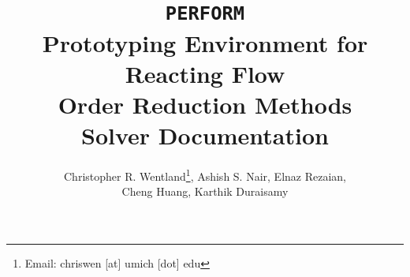 \documentclass[12pt]{article}
\title{\textbf{\texttt{PERFORM} \\ Prototyping Environment for Reacting Flow \\ Order Reduction Methods} \\ \vspace{0.5cm} Solver Documentation}
\author{Christopher R. Wentland\footnote{Email: chriswen [at] umich [dot] edu}, Ashish S. Nair, Elnaz Rezaian, \\ Cheng Huang, Karthik Duraisamy}
\begin{document}
\maketitle 

\newpage
\tableofcontents







\newpage
{}

\end{document}
